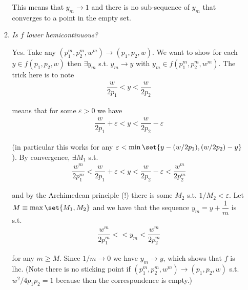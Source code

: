 \documentclass{article}
\begin{document}
\begin{enumerate}[1.]
\begin{enumerate}
        This means that $y_m \to 1$ and there is no sub-sequence of $y_m$ that converges to a point in the empty set.

      \item \textit{Is $f$ lower hemicontinuous?}

        \solution Yes. Take any $(p_1^m, p_2^m, w^m) \to (p_1, p_2, w)$. We want to show for each $y \in f(p_1, p_2, w)$ then $\exists y_m$ s.t. $y_m \to y$ with $y_m \in f(p_1^m, p_2^m, w^m)$. The trick here is to note
        \begin{align*}
          \dfrac{w}{2 p_1} < y < \dfrac{w}{2 p_2}
        \end{align*}

        means that  for some $\varepsilon > 0$ we have
        \begin{align*}
          \dfrac{w}{2 p_1} + \varepsilon < y < \dfrac{w}{2 p_2} - \varepsilon
        \end{align*}

        (in particular this works for any $\varepsilon < \min\set{y - (w / 2p_1), (w/2p_2) - y}$). By convergence, $\exists M_1$ s.t.
        \begin{align*}
          \dfrac{w^m}{2 p_1^m} < \dfrac{w}{2 p_1} + \varepsilon
          < 
          y 
          <
          \dfrac{w}{2 p_2} - \varepsilon
          <
          \dfrac{w^m}{2 p_2^m}
        \end{align*}

        and by the Archimedean principle (!) there is some $M_2$ s.t. $1 / M_2 < \varepsilon$. Let $M \equiv \max\set{M_1, M_2}$ and we have that the sequence $y_m = y + \dfrac{1}{m}$ is s.t.
        \begin{align*}
          \dfrac{w^m}{2 p_1^m} <
          < 
          y_m
          <
          \dfrac{w^m}{2 p_2^m}
        \end{align*}

        for any $m \ge M$. Since $1/m \to 0$ we have $y_m \to y$, which shows that $f$ is lhc. (Note there is no sticking point if $(p_1^m, p_2^m, w^m) \to (p_1, p_2, w)$ s.t. $w^2 / 4p_1p_2 = 1$ because then the correspondence is empty.)
    \end{enumerate}
\end{enumerate}

\end{document}
